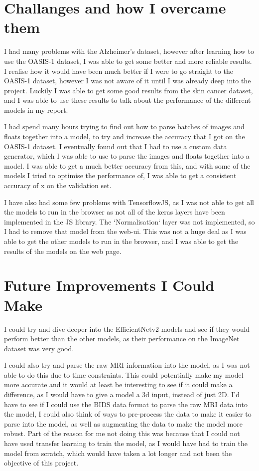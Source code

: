 \documentclass[]{final_report}
\begin{document}
\section{Challanges and how I overcame them}

I had many problems with the Alzheimer's dataset, however after learning how to use the OASIS-1 dataset, I was able to get some better and more reliable results. I realise how it would have been much better if I were to go straight to the OASIS-1 dataset, however I was not aware of it until I was already deep into the project. Luckily I was able to get some good results from the skin cancer dataset, and I was able to use these results to talk about the performance of the different models in my report.

I had spend many hours trying to find out how to parse batches of images and floats together into a model, to try and increase the accuracy that I got on the OASIS-1 dataset. I eventually found out that I had to use a custom data generator, which I was able to use to parse the images and floats together into a model. I was able to get a much better accuracy from this, and with some of the models I tried to optimise the performance of, I was able to get a consistent accuracy of x on the validation set.


I have also had some few problems with TensorflowJS\cite{smilkov2019tensorflowjs}, as I was not able to get all the models to run in the browser as not all of the keras layers have been implemented in the JS library. The `Normalisation` layer was not implemented, so I had to remove that model from the web-ui. This was not a huge deal as I was able to get the other models to run in the browser, and I was able to get the results of the models on the web page.

\section{Future Improvements I Could Make}

I could try and dive deeper into the EfficientNetv2 models and see if they would perform better than the other models, as their performance on the ImageNet\cite{ImageNet} dataset was very good. 

I could also try and parse the raw MRI information into the model, as I was not able to do this due to time constraints. This could potentially make my model more accurate and it would at least be interesting to see if it could make a difference, as I would have to give a model a 3d input, instead of just 2D. I'd have to see if I could use the BIDS data format to parse the raw MRI data into the model, I could also think of ways to pre-process the data to make it easier to parse into the model, as well as augmenting the data to make the model more robust. Part of the reason for me not doing this was because that I could not have used transfer learning to train the model, as I would have had to train the model from scratch, which would have taken a lot longer and not been the objective of this project.
\end{document}
